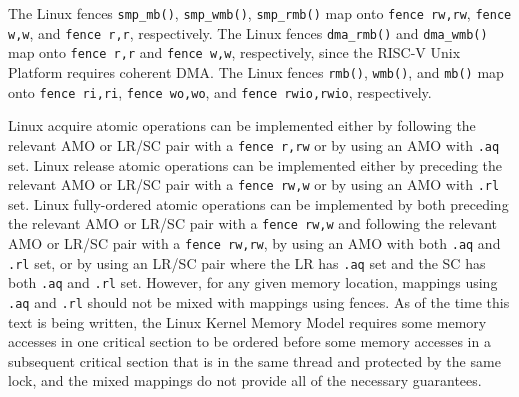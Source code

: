 The Linux fences {\tt smp\_mb()}, {\tt smp\_wmb()}, {\tt smp\_rmb()} map onto {\tt fence rw,rw}, {\tt fence w,w}, and {\tt fence r,r}, respectively.
The Linux fences {\tt dma\_rmb()} and {\tt dma\_wmb()} map onto {\tt fence r,r} and {\tt fence w,w}, respectively, since the RISC-V Unix Platform requires coherent DMA.
The Linux fences {\tt rmb()}, {\tt wmb()}, and {\tt mb()} map onto {\tt fence ri,ri}, {\tt fence wo,wo}, and {\tt fence rwio,rwio}, respectively.

Linux acquire atomic operations can be implemented either by following the relevant AMO or LR/SC pair with a {\tt fence r,rw} or by using an AMO with {\tt .aq} set.
Linux release atomic operations can be implemented either by preceding the relevant AMO or LR/SC pair with a {\tt fence rw,w} or by using an AMO with {\tt .rl} set.
Linux fully-ordered atomic operations can be implemented by both preceding the relevant AMO or LR/SC pair with a {\tt fence rw,w} and following the relevant AMO or LR/SC pair with a {\tt fence rw,rw}, by using an AMO with both {\tt .aq} and {\tt .rl} set, or by using an LR/SC pair where the LR has {\tt .aq} set and the SC has both {\tt .aq} and {\tt .rl} set.
However, for any given memory location, mappings using {\tt .aq} and {\tt .rl} should not be mixed with mappings using fences.
As of the time this text is being written, the Linux Kernel Memory Model requires some memory accesses in one critical section to be ordered before some memory accesses in a subsequent critical section that is in the same thread and protected by the same lock, and the mixed mappings do not provide all of the necessary guarantees.

